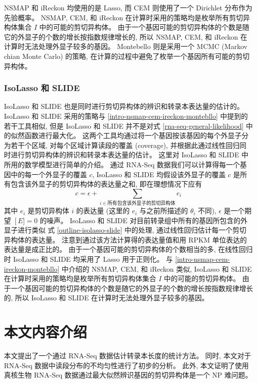NSMAP 和 iReckon 均使用的是 Lasso, 
而 CEM 则使用了一个 Dirichlet 分布作为先验概率。
NSMAP, CEM, 和 iReckon 在计算时采用的策略均是枚举所有剪切异构体集合 $I$ 中的可能的剪切异构体。 
由于一个基因可能的剪切异构体的个数是随它的外显子的个数的增长按指数规律增长的, 
所以 NSMAP, CEM, 和 iReckon 在计算时无法处理外显子较多的基因。 
Montebello 则是采用一个 MCMC (Markov chian Monte Carlo) \cite{robert2004monte} 的策略, 
在计算的过程中避免了枚举一个基因所有可能的剪切异构体。 

\subsubsection{IsoLasso 和 SLIDE}
IsoLasso 和 SLIDE 也是同时进行剪切异构体的辨识和转录本表达量的估计的。 
IsoLasso 和 SLIDE 采用的策略与 \ref{intro-nsmap-cem-ireckon-montebllo} 
中提到的若干工具相似, 但是 IsoLasso 和 SLIDE 并不是对式 
\eqref{rna-seq-general-likelihood} 中的似然函数进行最大化。 
这两个工具均通过将一个基因按该基因的每个外显子分为若干个区域, 
对每个区域计算读段的覆盖 (coverage), 
并根据此通过线性回归同时进行剪切异构体的辨识和转录本表达量的估计。 
这里对 IsoLasso 和 SLIDE 中所用的数学模型进行简单的介绍。 
通过 RNA-Seq 数据我们可以计算得每一个基因中的每一个外显子的覆盖 $c$, 
IsoLasso 和 SLIDE 均假设该外显子的覆盖 $c$ 是所有包含该外显子的剪切异构体的表达量之和, 
即在理想情况下应有
\begin{equation}
\label{outline-isolasso-slide}
c = \epsilon + \sum_{i \in \text{所有包含该外显子的剪切异构体}} e_i
\end{equation}
其中 $e_i$ 是剪切异构体 $i$ 的表达量 (这里的 $e_i$ 与之前所描述的 $\theta_i$ 不同), 
$\epsilon$ 是一个期望 $\operatorname[E] = 0$ 的噪声。 
IsoLasso 和 SLIDE 对目前转录组中所有的基因所包含的外显子进行类似 
式 \eqref{outline-isolasso-slide} 中的处理, 通过线性回归估计每一个剪切异构体的表达量。 
注意到通过该方法计算得的表达量值和用 RPKM 单位表达的表达量是成正比的。 
由于一个基因可能的剪切异构体的个数相当的多, 
在线性回归时 IsoLasso 和 SLIDE 均采用了 Lasso \cite{tibshirani1996regression} 用于正则化。 
与 \ref{intro-nsmap-cem-ireckon-montebllo} 中介绍的 NSMAP, CEM, 和 iReckon 类似, 
IsoLasso 和 SLIDE 在计算时采用的策略均是枚举所有剪切异构体集合 $I$ 中的可能的剪切异构体。 
由于一个基因可能的剪切异构体的个数是随它的外显子的个数的增长按指数规律增长的, 
所以 IsoLasso 和 SLIDE 在计算时无法处理外显子较多的基因。 

\section{本文内容介绍}
本文提出了一个通过 RNA-Seq 数据估计转录本长度的统计方法。 
同时, 本文对于 RNA-Seq 数据中读段分布的不均匀性进行了初步的分析。 
此外, 本文证明了使用真核生物 RNA-Seq 数据通过最大似然辨识基因的剪切异构体是一个 NP 难问题。

